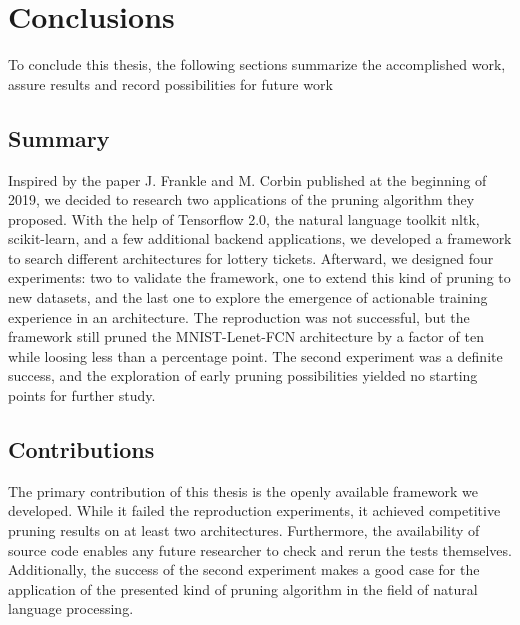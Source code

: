 \chapter{Conclusions}
\label{ch:closure}

To conclude this thesis, the following sections summarize the accomplished work, assure results and record possibilities for future work

\section{Summary}
Inspired by the paper J. Frankle and M. Corbin published at the beginning of 2019, we decided to research two applications of the pruning algorithm they proposed. With the help of Tensorflow 2.0, the natural language toolkit nltk, scikit-learn, and a few additional backend applications, we developed a framework to search different architectures for lottery tickets. Afterward, we designed four experiments: two to validate the framework, one to extend this kind of pruning to new datasets, and the last one to explore the emergence of actionable training experience in an architecture.  The reproduction was not successful, but the framework still pruned the MNIST-Lenet-FCN architecture by a factor of ten while loosing less than a percentage point. The second experiment was a definite success, and the exploration of early pruning possibilities yielded no starting points for further study.

\section{Contributions}
The primary contribution of this thesis is the openly available framework we developed. While it failed the reproduction experiments, it achieved competitive pruning results on at least two architectures. Furthermore, the availability of source code enables any future researcher to check and rerun the tests themselves. Additionally, the success of the second experiment makes a good case for the application of the presented kind of pruning algorithm in the field of natural language processing.

